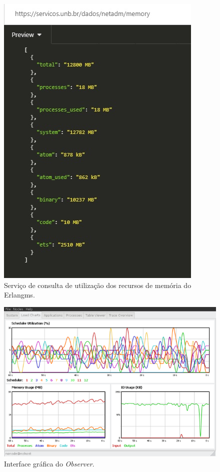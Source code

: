 {\begin{figure}[h!]
	\begin{center}
	\includegraphics[scale = 0.90]{img/monitoramentoEMS.jpg}
		\caption{Serviço de consulta de utilização dos recursos de memória do Erlangms.}
		\label{fun:fig:memoriaEMS}
	\end{center}
\end{figure}

\begin{figure}[h!]
	\begin{center}
	\includegraphics[scale = 0.70]{img/observerGo.jpg}
		\caption{Interface gráfica do \textit{Observer}.}
		\label{fun:fig:observer}
	\end{center}
\end{figure}

}
